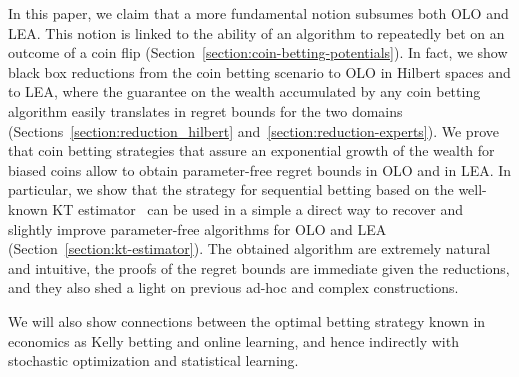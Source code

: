 In this paper, we claim that a more fundamental notion subsumes both \ac{OLO}
and \ac{LEA}. This notion is linked to the ability of an algorithm to repeatedly
bet on an outcome of a coin flip
(Section~\ref{section:coin-betting-potentials}). In fact, we show black box
reductions from the coin betting scenario to \ac{OLO} in Hilbert spaces and to
\ac{LEA}, where the guarantee on the wealth accumulated by any coin betting
algorithm easily translates in regret bounds for the two domains
(Sections~\ref{section:reduction_hilbert} and~\ref{section:reduction-experts}).
We prove that coin betting strategies that assure an exponential growth of the
wealth for biased coins allow to obtain parameter-free regret bounds in \ac{OLO}
and in \ac{LEA}. In particular, we show that the strategy for sequential betting
based on the well-known \ac{KT} estimator~\citep{KrichevskyT81} can be used in a
simple a direct way to recover and slightly improve parameter-free algorithms
for \ac{OLO} and \ac{LEA} (Section~\ref{section:kt-estimator}). The obtained
algorithm are extremely natural and intuitive, the proofs of the regret bounds
are immediate given the reductions, and they also shed a light on previous
ad-hoc and complex constructions.

We will also show connections between the optimal betting strategy known in
economics as Kelly betting \citep{Kelly56} and online learning, and hence
indirectly with stochastic optimization and statistical learning.
